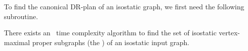 To find the canonical DR-plan of an isostatic graph, we first need the following subroutine.




\begin{theorem}\label{theorem:algo_find_wcvmps_complexity}
    There exists an \complexityAllClustersV\ time complexity algorithm to find the set of isostatic vertex-maximal proper subgraphs (the ) of an isostatic input graph.
\end{theorem}

